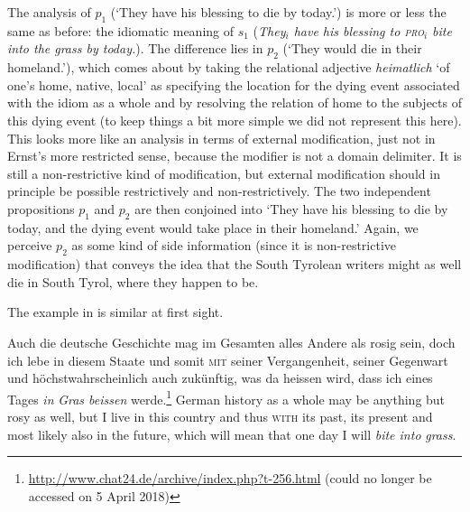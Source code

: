 \documentclass[output=paper]{langsci/langscibook}
\begin{document}



\noindent The analysis of $p_{1}$ (`They have his blessing to die by today.') is more or less the same as before: the idiomatic meaning of $s_{1}$ (\textit{They$_{i}$ have his blessing to \textsc{pro}$_i$ bite into the grass by today.}). The difference lies in $p_{2}$ (`They would die in their homeland.'), which comes about by taking the relational adjective \textit{heimatlich} `of one's home, native, local' as specifying the location for the dying event associated with the idiom as a whole and by resolving the relation of home to the subjects of this dying event (to keep things a bit more simple we did not represent this here). This looks more like an analysis in terms of external modification, just not in Ernst's more restricted sense, because the modifier is not a domain delimiter. It is still a non-restrictive kind of modification, but external modification should in principle be possible restrictively and non-restrictively. The two independent propositions $p_{1}$ and $p_{2}$ are then conjoined into `They have his blessing to die by today, and the dying event would take place in their homeland.' Again, we perceive $p_{2}$ as some kind of side information (since it is non-restrictive modification) that conveys the idea that the South Tyrolean writers might as well die in South Tyrol, where they happen to be.

The example in  is similar at first sight.

\ea \label{German grass}
Auch die deutsche Geschichte mag im Gesamten alles Andere als rosig sein, doch ich lebe in diesem Staate und somit \textsc{mit} seiner Vergangenheit, seiner Gegenwart und höchstwahrscheinlich auch zukünftig, was da heissen wird, dass ich eines Tages \textit{in} \underline{} \textit{Gras beissen} werde.\footnote{\url{http://www.chat24.de/archive/index.php?t-256.html} 
(could no longer be accessed on 5 April 2018)}
\glt German history as a whole may be anything but rosy as well, but I live in this country and thus \textsc{with} its past, its present and most likely also in the future, which will mean that one day I will \textit{bite into} \underline{} \textit{grass}.
\z
\end{document}
